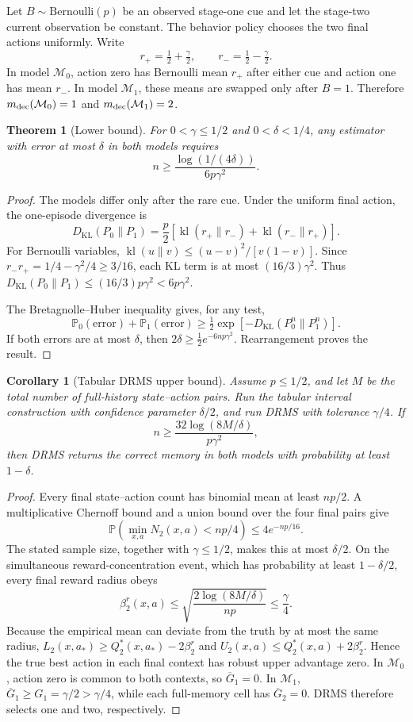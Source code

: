 \documentclass[letterpaper]{article} %
\newtheorem{theorem}{Theorem}
\newtheorem{corollary}{Corollary}
\newcommand{\Pp}{\mathbb P}
\newcommand{\KL}{D_{\mathrm{KL}}}
\begin{document}
Let \(B\sim\mathrm{Bernoulli}(p)\) be an observed stage-one cue and let the
stage-two current observation be constant.  The behavior policy chooses the
two final actions uniformly.  Write
\[
r_+=\tfrac12+\tfrac\gamma2,\qquad
r_-=\tfrac12-\tfrac\gamma2.
\]
In model \(\mathcal M_0\), action zero has Bernoulli mean \(r_+\) after
either cue and action one has mean \(r_-\).  In model \(\mathcal M_1\),
these means are swapped only after \(B=1\).  Therefore
\(m_{\rm dec}(\mathcal M_0)=1\) and
\(m_{\rm dec}(\mathcal M_1)=2\).

\begin{theorem}[Lower bound]
For \(0<\gamma\leq1/2\) and \(0<\delta<1/4\), any estimator with error at
most \(\delta\) in both models requires
\[
n\geq\frac{\log(1/(4\delta))}{6p\gamma^2}.
\]
\end{theorem}
\begin{proof}
The models differ only after the rare cue.  Under the uniform final action,
the one-episode divergence is
\[
\KL(P_0\|P_1)
=\frac p2\left[
\operatorname{kl}(r_+\|r_-)+\operatorname{kl}(r_-\|r_+)
\right].
\]
For Bernoulli variables,
\(\operatorname{kl}(u\|v)\leq(u-v)^2/[v(1-v)]\).  Since
\(r_-r_+=1/4-\gamma^2/4\geq3/16\), each KL term is at most
\((16/3)\gamma^2\).  Thus
\(\KL(P_0\|P_1)\leq(16/3)p\gamma^2<6p\gamma^2\).

The Bretagnolle--Huber inequality gives, for any test,
\[
\Pp_0(\text{error})+\Pp_1(\text{error})
\geq\tfrac12\exp[-\KL(P_0^n\|P_1^n)].
\]
If both errors are at most \(\delta\), then
\(2\delta\geq\tfrac12e^{-6np\gamma^2}\).  Rearrangement proves the
result.
\end{proof}

\begin{corollary}[Tabular DRMS upper bound]
Assume \(p\leq1/2\), and let \(M\) be the total number of full-history
state--action pairs.  Run the tabular interval construction with confidence
parameter \(\delta/2\), and run DRMS with tolerance \(\gamma/4\).  If
\[
n\geq\frac{32\log(8M/\delta)}{p\gamma^2},
\]
then DRMS returns the correct memory in both models with probability at least
\(1-\delta\).
\end{corollary}
\begin{proof}
Every final state--action count has binomial mean at least \(np/2\).  A
multiplicative Chernoff bound and a union bound over the four final pairs give
\[
\Pp\!\left(\min_{x,a}N_2(x,a)<np/4\right)
\leq4e^{-np/16}.
\]
The stated sample size, together with \(\gamma\leq1/2\), makes this at most
\(\delta/2\).  On the simultaneous reward-concentration event, which has
probability at least \(1-\delta/2\), every final reward radius obeys
\[
\beta^r_2(x,a)
\leq\sqrt{\frac{2\log(8M/\delta)}{np}}
\leq\frac\gamma4.
\]
Because the empirical mean can deviate from the truth by at most the same
radius, \(L_2(x,a_*)\geq Q_2^*(x,a_*)-2\beta^r_2\) and
\(U_2(x,a)\leq Q_2^*(x,a)+2\beta^r_2\).  Hence the true best action in
each final context has robust upper advantage zero.  In \(\mathcal M_0\),
action zero is common to both contexts, so \(\overline G_1=0\).  In
\(\mathcal M_1\), \(\overline G_1\geq G_1=\gamma/2>\gamma/4\), while
each full-memory cell has \(\overline G_2=0\).  DRMS therefore selects one
and two, respectively.
\end{proof}
\end{document}
